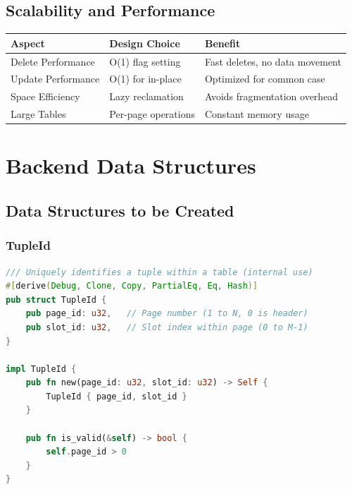 \documentclass[11pt,a4paper]{article}
\begin{document}
\subsection{Scalability and Performance}

\begin{table}[H]
\centering
\begin{tabular}{@{}lll@{}}
\toprule
\textbf{Aspect} & \textbf{Design Choice} & \textbf{Benefit} \\
\midrule
Delete Performance & O(1) flag setting & Fast deletes, no data movement \\
Update Performance & O(1) for in-place & Optimized for common case \\
Space Efficiency & Lazy reclamation & Avoids fragmentation overhead \\
Large Tables & Per-page operations & Constant memory usage \\
\bottomrule
\end{tabular}
\end{table}

\section{Backend Data Structures}

\subsection{Data Structures to be Created}

\subsubsection{TupleId}

\begin{lstlisting}[language=Rust]
/// Uniquely identifies a tuple within a table (internal use)
#[derive(Debug, Clone, Copy, PartialEq, Eq, Hash)]
pub struct TupleId {
    pub page_id: u32,   // Page number (1 to N, 0 is header)
    pub slot_id: u32,   // Slot index within page (0 to M-1)
}

impl TupleId {
    pub fn new(page_id: u32, slot_id: u32) -> Self {
        TupleId { page_id, slot_id }
    }

    pub fn is_valid(&self) -> bool {
        self.page_id > 0
    }
}
\end{lstlisting}
\end{document}

